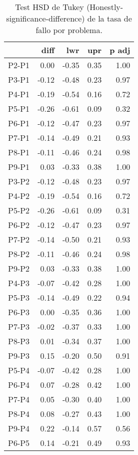 \begin{table}[ht]
\centering
\caption{Test HSD de Tukey (Honestly-significance-difference) de la tasa de fallo por problema.}
\label{tab:Tukeyfailratio}
\begin{tabular}{rrrrr}
  \hline
 & diff & lwr & upr & p adj \\ 
  \hline
P2-P1 & 0.00 & -0.35 & 0.35 & 1.00 \\ 
  P3-P1 & -0.12 & -0.48 & 0.23 & 0.97 \\ 
  P4-P1 & -0.19 & -0.54 & 0.16 & 0.72 \\ 
  P5-P1 & -0.26 & -0.61 & 0.09 & 0.32 \\ 
  P6-P1 & -0.12 & -0.47 & 0.23 & 0.97 \\ 
  P7-P1 & -0.14 & -0.49 & 0.21 & 0.93 \\ 
  P8-P1 & -0.11 & -0.46 & 0.24 & 0.98 \\ 
  P9-P1 & 0.03 & -0.33 & 0.38 & 1.00 \\ 
  P3-P2 & -0.12 & -0.48 & 0.23 & 0.97 \\ 
  P4-P2 & -0.19 & -0.54 & 0.16 & 0.72 \\ 
  P5-P2 & -0.26 & -0.61 & 0.09 & 0.31 \\ 
  P6-P2 & -0.12 & -0.47 & 0.23 & 0.97 \\ 
  P7-P2 & -0.14 & -0.50 & 0.21 & 0.93 \\ 
  P8-P2 & -0.11 & -0.46 & 0.24 & 0.98 \\ 
  P9-P2 & 0.03 & -0.33 & 0.38 & 1.00 \\ 
  P4-P3 & -0.07 & -0.42 & 0.28 & 1.00 \\ 
  P5-P3 & -0.14 & -0.49 & 0.22 & 0.94 \\ 
  P6-P3 & 0.00 & -0.35 & 0.36 & 1.00 \\ 
  P7-P3 & -0.02 & -0.37 & 0.33 & 1.00 \\ 
  P8-P3 & 0.01 & -0.34 & 0.37 & 1.00 \\ 
  P9-P3 & 0.15 & -0.20 & 0.50 & 0.91 \\ 
  P5-P4 & -0.07 & -0.42 & 0.28 & 1.00 \\ 
  P6-P4 & 0.07 & -0.28 & 0.42 & 1.00 \\ 
  P7-P4 & 0.05 & -0.30 & 0.40 & 1.00 \\ 
  P8-P4 & 0.08 & -0.27 & 0.43 & 1.00 \\ 
  P9-P4 & 0.22 & -0.14 & 0.57 & 0.56 \\ 
  P6-P5 & 0.14 & -0.21 & 0.49 & 0.93 \\ 

\end{tabular}
\end{table}
